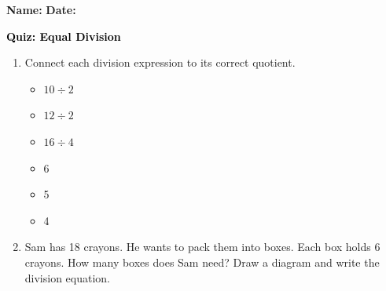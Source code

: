 \documentclass[12pt, letterpaper, fleqn]{article}
\begin{document}
\textbf{Name:} \underline{\hspace{5cm}}
\hfill
\textbf{Date:} \underline{\hspace{3cm}}\\

\begin{tcolorbox}[colback=customteal!20]
    \large\textcolor{black}{\textbf{Quiz: Equal Division}}
\end{tcolorbox}

\vspace{5mm}
\begin{enumerate}[itemsep=2.5cm, leftmargin=0.6cm]
\item Connect each division expression to its correct quotient.
\\
\begin{minipage}{0.4\textwidth}
\begin{itemize}[itemsep=1cm]
  \item $10 \div 2$
  \item $12 \div 2$
  \item $16 \div 4$
\end{itemize}
\end{minipage}
\begin{minipage}{0.4\textwidth}
\begin{itemize}[itemsep=1cm]
  \item 6
  \item 5
  \item 4
\end{itemize}
\end{minipage}

\item Sam has 18 crayons. He wants to pack them into boxes. Each box holds 6 crayons. How many boxes does Sam need? Draw a diagram and write the division equation.
\end{enumerate}
\end{document}
